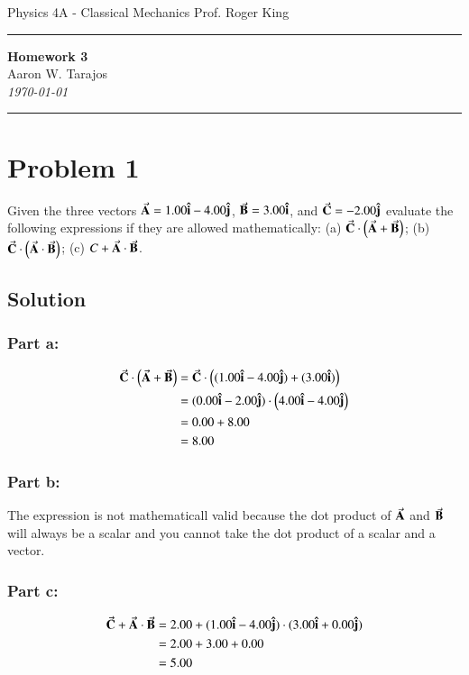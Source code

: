 \documentclass{article}
\begin{document}
\noindent
Physics 4A - Classical Mechanics \hfill Prof. Roger King

\noindent\rule{\textwidth}{0.4pt}

\begin{center}
    \textbf{\LARGE Homework 3} \\
    \vspace{12pt}
    \large Aaron W. Tarajos \\
    \textit{\today}
\end{center}

\noindent\rule{\textwidth}{0.4pt}

\section*{Problem 1}
Given the three vectors $\va A = 1.00 \vu i  -4.00 \vu j$, $\va B = 3.00 \vu i$, and $\va C = -2.00 \vu j$ evaluate the following expressions if they are allowed mathematically: (a) $\va C \cdot \left( \va A + \va B \right)$; (b) $\va C \cdot \left( \va A \cdot \va B \right)$; (c) $C + \va A \cdot \va B$.

\subsection*{Solution}
\subsubsection*{Part a:}
\begin{align*}
	\va C \cdot \left( \va A + \va B \right) &= \va C \cdot \left((1.00 \vu i  -4.00 \vu j) + (3.00 \vu i)\right) \\
	&= (0.00 \vu i -2.00 \vu j) \cdot \left( 4.00 \vu i -4.00 \vu j\right) \\
	&= 0.00 + 8.00 \\
	&= 8.00
\end{align*}

\subsubsection*{Part b:}
The expression is not mathematicall valid because the dot product of $\va A$ and $\va B$ will always be a scalar and you cannot take the dot product of a scalar and a vector.

\subsubsection*{Part c:}
\begin{align*}
	\va C + \va A \cdot \va B &= 2.00 + (1.00 \vu i  -4.00 \vu j) \cdot (3.00 \vu i + 0.00 \vu j) \\
				  &= 2.00 + 3.00 + 0.00 \\
				  &= 5.00
\end{align*}
\end{document}
